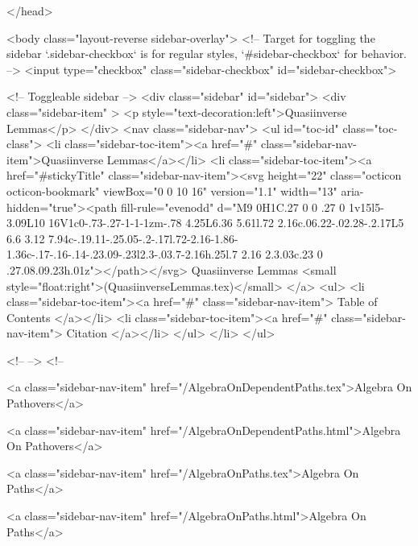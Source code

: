 </head>


  <body class="layout-reverse sidebar-overlay">
    <!-- Target for toggling the sidebar `.sidebar-checkbox` is for regular
     styles, `#sidebar-checkbox` for behavior. -->
<input type="checkbox" class="sidebar-checkbox" id="sidebar-checkbox">

<!-- Toggleable sidebar -->
<div class="sidebar" id="sidebar">
  <div class="sidebar-item" >
    <p style="text-decoration:left">Quasiinverse Lemmas</p>
  </div>
  <nav class="sidebar-nav">
    <ul id="toc-id" class="toc-class">
  <li class="sidebar-toc-item"><a href="#" class="sidebar-nav-item">Quasiinverse Lemmas</a></li>
  <li class="sidebar-toc-item"><a href="#stickyTitle" class="sidebar-nav-item"><svg height="22" class="octicon octicon-bookmark" viewBox="0 0 10 16" version="1.1" width="13" aria-hidden="true"><path fill-rule="evenodd" d="M9 0H1C.27 0 0 .27 0 1v15l5-3.09L10 16V1c0-.73-.27-1-1-1zm-.78 4.25L6.36 5.61l.72 2.16c.06.22-.02.28-.2.17L5 6.6 3.12 7.94c-.19.11-.25.05-.2-.17l.72-2.16-1.86-1.36c-.17-.16-.14-.23.09-.23l2.3-.03.7-2.16h.25l.7 2.16 2.3.03c.23 0 .27.08.09.23h.01z"></path></svg> Quasiinverse Lemmas <small style="float:right">(QuasiinverseLemmas.tex)</small>
</a>
    <ul>
      <li class="sidebar-toc-item"><a href="#" class="sidebar-nav-item"> Table of Contents </a></li>
      <li class="sidebar-toc-item"><a href="#" class="sidebar-nav-item"> Citation </a></li>
    </ul>
  </li>
</ul>


    <!--  -->
    <!-- 
      
    
      
    
      
    
      
        
      
    
      
        
          <a class="sidebar-nav-item" href="/AlgebraOnDependentPaths.tex">Algebra On Pathovers</a>
        
      
    
      
        
          <a class="sidebar-nav-item" href="/AlgebraOnDependentPaths.html">Algebra On Pathovers</a>
        
      
    
      
        
          <a class="sidebar-nav-item" href="/AlgebraOnPaths.tex">Algebra On Paths</a>
        
      
    
      
        
          <a class="sidebar-nav-item" href="/AlgebraOnPaths.html">Algebra On Paths</a>
        
